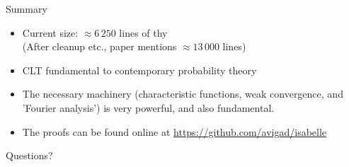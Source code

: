 \documentclass[usepdftitle=false]{beamer}
\begin{document}
\begin{frame}{Summary} %
\begin{itemize}

\item Current size: $\approx 6\,250$ lines of thy\\
  (After cleanup etc., paper mentions $\approx 13\,000$ lines)

\pause

\item CLT fundamental to contemporary probability theory

\pause

\item The necessary machinery (characteristic functions, weak convergence, and 'Fourier analysis') is very powerful, and also fundamental.

\item The proofs can be found online at \url{https://github.com/avigad/isabelle}

\end{itemize}


\begin{center} \LARGE Questions? \end{center}

\end{frame} %
\end{document}
